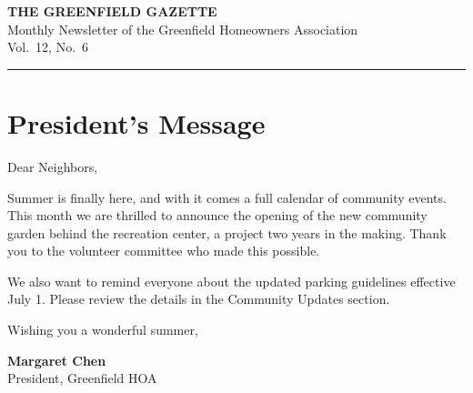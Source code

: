 \documentclass[
    language=english,
    doctype=newsletter,
    institution=none,
]{../../omnilatex}
\begin{document}
\begin{center}
    {\Large\bfseries THE GREENFIELD GAZETTE}\\[4pt]
    {\small Monthly Newsletter of the Greenfield Homeowners Association}\\[2pt]
    {\small\thedate\hfill Vol.\ 12, No.\ 6}
\end{center}

\vspace{0.5em}
\noindent\rule{\textwidth}{0.4pt}
\vspace{0.5em}

\section*{President's Message}

Dear Neighbors,

Summer is finally here, and with it comes a full calendar of community events.
This month we are thrilled to announce the opening of the new community garden
behind the recreation center, a project two years in the making. Thank you to
the volunteer committee who made this possible.

We also want to remind everyone about the updated parking guidelines effective
July 1. Please review the details in the Community Updates section.

Wishing you a wonderful summer,
\vspace{0.3em}

\noindent\textbf{Margaret Chen}\\
President, Greenfield HOA

\vspace{0.5em}
\end{document}
